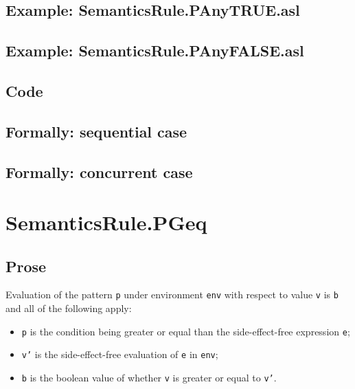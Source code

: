 \documentclass{book}
\begin{document}
    \subsection{Example: SemanticsRule.PAnyTRUE.asl}

    \subsection{Example: SemanticsRule.PAnyFALSE.asl}

    \subsection{Code}

\begin{emptyformal}
    \subsection{Formally: sequential case}

    \subsection{Formally: concurrent case}
\end{emptyformal}


\section{SemanticsRule.PGeq \label{sec:SemanticsRule.PGeq}}

    \subsection{Prose}
    Evaluation of the pattern \texttt{p} under environment \texttt{env} with
    respect to value \texttt{v} is \texttt{b} and all of the following apply:
    \begin{itemize}
      \item \texttt{p} is the condition being greater or equal than the side-effect-free expression \texttt{e};
      \item \texttt{v'} is the side-effect-free evaluation of \texttt{e} in \texttt{env};
      \item \texttt{b} is the boolean value of whether \texttt{v} is greater or equal to \texttt{v'}.
    \end{itemize}
\end{document}
